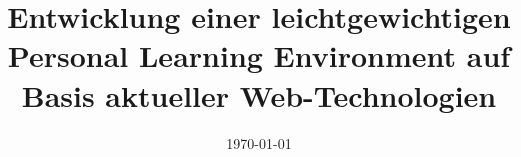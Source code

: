 \documentclass[a4paper, 11pt, oneside]{Thesis}  %
\begin{document}
\frontmatter	  %

\title  {Entwicklung einer leichtgewichtigen Personal Learning Environment auf Basis aktueller Web-Technologien}
\addresses  {\groupname\\\deptname\\\univname}  %
\date       {\today}
\subject    {}
\keywords   {}

\maketitle


\fancyhead{}  %
\rhead{\thepage}  %
\lhead{}  %

\pagestyle{fancy}  %






\end{document}
